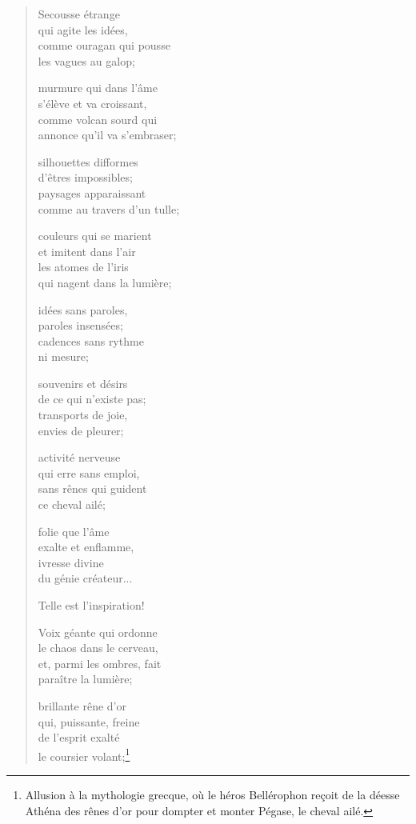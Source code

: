 \begin{verse}
  Secousse étrange \\
  qui agite les idées, \\
  comme ouragan qui pousse \\
  les vagues au galop;

  murmure qui dans l'âme \\
  s'élève et va croissant, \\
  comme volcan sourd qui \\
  annonce qu'il va s'embraser;

  silhouettes difformes \\
  d'êtres impossibles; \\
  paysages apparaissant \\
  comme au travers d'un tulle;

  couleurs qui se marient \\
  et imitent dans l'air \\
  les atomes de l'iris \\
  qui nagent dans la lumière;

  idées sans paroles, \\
  paroles insensées; \\
  cadences sans rythme \\
  ni mesure;

  souvenirs et désirs \\
  de ce qui n'existe pas; \\
  transports de joie, \\
  envies de pleurer;

  activité nerveuse \\
  qui erre sans emploi, \\
  sans rênes qui guident \\
  ce cheval ailé;

  folie que l'âme \\
  exalte et enflamme, \\
  ivresse divine \\
  du génie créateur...

  Telle est l'inspiration!

  Voix géante qui ordonne \\
  le chaos dans le cerveau, \\
  et, parmi les ombres, fait \\
  paraître la lumière;

  brillante rêne d'or \\
  qui, puissante, freine \\
  de l'esprit exalté \\
  le coursier volant;\footnote{Allusion à la mythologie grecque, où le
  héros Bellérophon reçoit de la déesse Athéna des rênes d'or pour
  dompter et monter Pégase, le cheval ailé.}


\end{verse}
